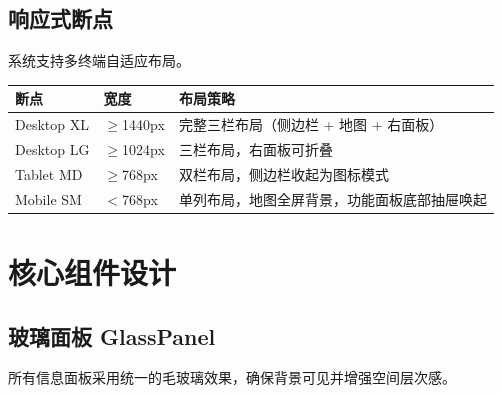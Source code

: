 \subsection{响应式断点}

 系统支持多终端自适应布局。

\begin{center}
\renewcommand{\arraystretch}{1.5}
\begin{tabularx}{\textwidth}{>{\centering\arraybackslash\heiti}p{2.5cm} >{\centering\arraybackslash}p{2cm} X}
\toprule
\textbf{断点} & \textbf{宽度} & \textbf{布局策略} \\
\midrule
Desktop XL & $\geq$1440px & 完整三栏布局（侧边栏 + 地图 + 右面板） \\
Desktop LG & $\geq$1024px & 三栏布局，右面板可折叠 \\
Tablet MD & $\geq$768px & 双栏布局，侧边栏收起为图标模式 \\
Mobile SM & $<$768px & 单列布局，地图全屏背景，功能面板底部抽屉唤起 \\
\bottomrule
\end{tabularx}
\end{center}

\newpage
\section{核心组件设计}

\subsection{玻璃面板 GlassPanel}

 所有信息面板采用统一的毛玻璃效果，确保背景可见并增强空间层次感。

